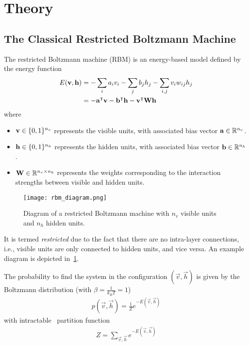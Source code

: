 \section{Theory}
\subsection{The Classical Restricted Boltzmann Machine}
The restricted Boltzmann machine (RBM) is an energy-based model defined by the energy function~\cite{goodfellow_deep_learning}
\begin{align}
\begin{split}
    E(\mathbf{v}, \mathbf{h})
        &= -\sum_i a_i v_i - \sum_j b_j h_j - \sum_{i,j} v_i w_{ij} h_j \\
        &= -\mathbf{a}^\intercal\mathbf{v} - \mathbf{b}^\intercal\mathbf{h} - \mathbf{v}^\intercal\mathbf{W}\mathbf{h}
\end{split}
\end{align}
where
\begin{itemize}
    \item \( \mathbf{v} \in \{0,1\}^{n_v} \) represents the visible units, with associated bias vector \( \mathbf{a} \in \mathbb{R}^{n_v} \).
    \item \( \mathbf{h} \in \{0,1\}^{n_h} \) represents the hidden units, with associated bias vector \( \mathbf{b} \in \mathbb{R}^{n_h} \).
    \item \( \mathbf{W} \in \mathbb{R}^{n_v \times n_h} \) represents the weights corresponding to the interaction strengths between visible and hidden units.
\end{itemize}

\begin{figure}[!htb]
    \begin{center}
        \texttt{[image: rbm\_diagram.png]}
    \end{center}
    \caption{Diagram of a restricted Boltzmann machine with \( n_v \) visible units and \( n_h \) hidden units.}
    \label{fig:rbm_diagram}
\end{figure}

It is termed \textit{restricted} due to the fact that there are no intra-layer connections, i.e., visible units are only connected to hidden units, and vice versa.
An example diagram is depicted in~\cref{fig:rbm_diagram}.

The probability to find the system in the configuration \( (\vec{v},\vec{h}) \) is given by the Boltzmann distribution (with \( \beta = \frac{1}{k_BT} = 1 \))
\begin{align}
    p(\vec{v}, \vec{h}) = \frac{1}{Z} e^{-E(\vec{v},\vec{h})}
\end{align}
with intractable~\cite{long_servedio_2010} partition function
\begin{align}
    Z = \sum_{\vec{v},\vec{h}} e^{-E(\vec{v},\vec{h})}
\end{align}

